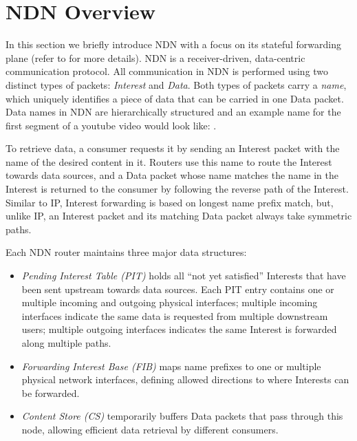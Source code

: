 \section{NDN Overview\label{sec:ccn-intro}}

In this section we briefly introduce NDN with a focus on its stateful forwarding plane (refer to \cite{ndn-conext, ndn-tr, adaptive-forwarding} for more details).
NDN is a receiver-driven, data-centric communication protocol.
All communication in NDN is performed using two distinct types of packets: \textit{Interest} and \textit{Data}. Both types of packets carry a \textit{name}, which uniquely identifies a piece of data that can be carried in one Data packet. 
Data names in NDN are hierarchically structured and an example name for the first segment of a youtube video would look like: .

To retrieve data, a consumer requests it by sending an Interest packet with the name of the desired content in it.
Routers use this name to route the Interest towards data sources, and a Data packet whose name matches the name in the Interest is returned to the consumer by following the reverse path of the Interest. Similar to IP, Interest forwarding is based on longest name prefix match, but, unlike IP, an Interest packet and its matching Data packet always take symmetric paths.

Each NDN router maintains three major data structures:
\begin{itemize}
\item \textit{Pending Interest Table (PIT)} holds all ``not yet satisfied'' Interests that have been sent upstream towards data sources. Each PIT entry contains one or multiple incoming and outgoing physical interfaces; multiple incoming interfaces indicate the same data is requested from multiple downstream users; multiple outgoing interfaces indicates the same Interest is forwarded along multiple paths.
\item \textit{Forwarding Interest Base (FIB)} maps name prefixes to one or multiple physical network interfaces, defining allowed %
 directions to where Interests can be forwarded. 
\item \textit{Content Store (CS)} temporarily buffers Data packets that pass through this node, allowing efficient data retrieval by different consumers.
\end{itemize}

